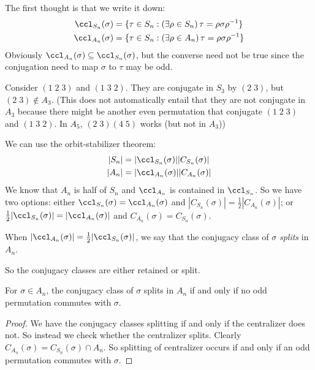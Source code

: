\documentclass[a4paper]{article}
\begin{document}
The first thought is that we write it down:
\begin{align*}
  \ccl_{S_n}(\sigma) &= \{\tau\in S_n: (\exists \rho \in S_n)\, \tau = \rho\sigma\rho^{-1}\}\\
  \ccl_{A_n}(\sigma) &= \{\tau\in S_n: (\exists \rho \in A_n)\, \tau = \rho\sigma\rho^{-1}\}
\end{align*}
Obviously $\ccl_{A_n}(\sigma)\subseteq \ccl_{S_n}(\sigma)$, but the converse need not be true since the conjugation need to map $\sigma$ to $\tau$ may be odd.

\begin{eg}
  Consider $(1\; 2\; 3)$ and $(1\; 3\; 2)$. They are conjugate in $S_3$ by $(2\; 3)$, but $(2\; 3)\not\in A_3$. (This does not automatically entail that they are not conjugate in $A_3$ because there might be another even permutation that conjugate $(1\; 2\; 3)$ and $(1\; 3\; 2)$. In $A_5$, $(2\; 3)(4\; 5)$ works (but not in $A_3$))
\end{eg}

We can use the orbit-stabilizer theorem:
\begin{align*}
  |S_n| &= |\ccl_{S_n}(\sigma)||C_{S_n}(\sigma)|\\
  |A_n| &= |\ccl_{A_n}(\sigma)||C_{A_n}(\sigma)|
\end{align*}
We know that $A_n$ is half of $S_n$ and $\ccl_{A_n}$ is contained in $\ccl_{S_n}$. So we have two options: either $\ccl_{S_n}(\sigma) = \ccl_{A_n}(\sigma)$ and $|C_{S_n}(\sigma)| = \frac{1}{2}|C_{A_n}(\sigma)|$; or $\frac{1}{2}|\ccl_{S_n}(\sigma)| = |\ccl_{A_n}(\sigma)|$ and $C_{A_n}(\sigma) = C_{S_n}(\sigma)$.

\begin{defi}
  When $|\ccl_{A_n}(\sigma)| = \frac{1}{2}|\ccl_{S_n}(\sigma)|$, we say that the conjugacy class of $\sigma$ \emph{splits} in $A_n$.
\end{defi}

So the conjugacy classes are either retained or split.

\begin{prop}
  For $\sigma\in A_n$, the conjugacy class of $\sigma$ splits in $A_n$ if and only if no odd permutation commutes with $\sigma$.
\end{prop}

\begin{proof}
  We have the conjugacy classes splitting if and only if the centralizer does not. So instead we check whether the centralizer splits. Clearly $C_{A_n}(\sigma) = C_{S_n}(\sigma)\cap A_n$. So splitting of centralizer occurs if and only if an odd permutation commutes with $\sigma$.
\end{proof}
\end{document}
